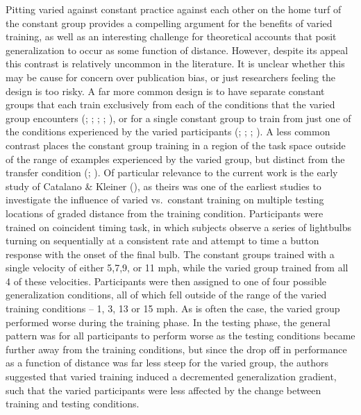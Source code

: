 \documentclass[
  11pt,
  letterpaper,
]{article}
\begin{document}
Pitting varied against constant practice against each other on the home
turf of the constant group provides a compelling argument for the
benefits of varied training, as well as an interesting challenge for
theoretical accounts that posit generalization to occur as some function
of distance. However, despite its appeal this contrast is relatively
uncommon in the literature. It is unclear whether this may be cause for
concern over publication bias, or just researchers feeling the design is
too risky. A far more common design is to have separate constant groups
that each train exclusively from each of the conditions that the varied
group encounters
(; ; ;
;
), or for a single constant group to train from just one of the
conditions experienced by the varied participants
(;
;
; ). A less common contrast places the constant group training
in a region of the task space outside of the range of examples
experienced by the varied group, but distinct from the transfer
condition
(; ). Of particular relevance to the current work is the
early study of Catalano \& Kleiner
(), as theirs
was one of the earliest studies to investigate the influence of varied
vs.~constant training on multiple testing locations of graded distance
from the training condition. Participants were trained on coincident
timing task, in which subjects observe a series of lightbulbs turning on
sequentially at a consistent rate and attempt to time a button response
with the onset of the final bulb. The constant groups trained with a
single velocity of either 5,7,9, or 11 mph, while the varied group
trained from all 4 of these velocities. Participants were then assigned
to one of four possible generalization conditions, all of which fell
outside of the range of the varied training conditions -- 1, 3, 13 or 15
mph. As is often the case, the varied group performed worse during the
training phase. In the testing phase, the general pattern was for all
participants to perform worse as the testing conditions became further
away from the training conditions, but since the drop off in performance
as a function of distance was far less steep for the varied group, the
authors suggested that varied training induced a decremented
generalization gradient, such that the varied participants were less
affected by the change between training and testing conditions.
\end{document}
